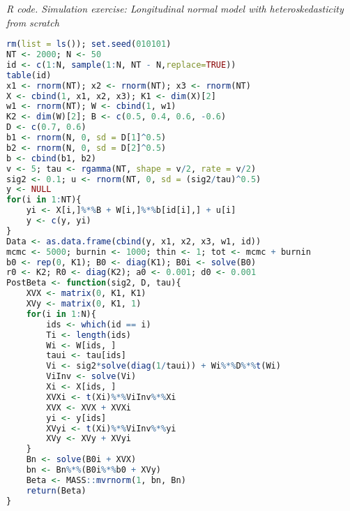 \begin{tcolorbox}[enhanced,width=4.67in,center upper,
	fontupper=\large\bfseries,drop shadow southwest,sharp corners]
	\textit{R code. Simulation exercise: Longitudinal normal model with heteroskedasticity from scratch}
	\begin{VF}
		\begin{lstlisting}[language=R]
rm(list = ls()); set.seed(010101)
NT <- 2000; N <- 50
id <- c(1:N, sample(1:N, NT - N,replace=TRUE))
table(id)
x1 <- rnorm(NT); x2 <- rnorm(NT); x3 <- rnorm(NT) 
X <- cbind(1, x1, x2, x3); K1 <- dim(X)[2]
w1 <- rnorm(NT); W <- cbind(1, w1)
K2 <- dim(W)[2]; B <- c(0.5, 0.4, 0.6, -0.6)
D <- c(0.7, 0.6)
b1 <- rnorm(N, 0, sd = D[1]^0.5)
b2 <- rnorm(N, 0, sd = D[2]^0.5)
b <- cbind(b1, b2)
v <- 5; tau <- rgamma(NT, shape = v/2, rate = v/2)
sig2 <- 0.1; u <- rnorm(NT, 0, sd = (sig2/tau)^0.5)
y <- NULL
for(i in 1:NT){
	yi <- X[i,]%*%B + W[i,]%*%b[id[i],] + u[i] 
	y <- c(y, yi)
}
Data <- as.data.frame(cbind(y, x1, x2, x3, w1, id))
mcmc <- 5000; burnin <- 1000; thin <- 1; tot <- mcmc + burnin
b0 <- rep(0, K1); B0 <- diag(K1); B0i <- solve(B0) 
r0 <- K2; R0 <- diag(K2); a0 <- 0.001; d0 <- 0.001
PostBeta <- function(sig2, D, tau){
	XVX <- matrix(0, K1, K1)
	XVy <- matrix(0, K1, 1)
	for(i in 1:N){
		ids <- which(id == i)
		Ti <- length(ids)
		Wi <- W[ids, ]
		taui <- tau[ids]
		Vi <- sig2*solve(diag(1/taui)) + Wi%*%D%*%t(Wi)
		ViInv <- solve(Vi)
		Xi <- X[ids, ]
		XVXi <- t(Xi)%*%ViInv%*%Xi
		XVX <- XVX + XVXi
		yi <- y[ids]
		XVyi <- t(Xi)%*%ViInv%*%yi
		XVy <- XVy + XVyi
	}
	Bn <- solve(B0i + XVX)
	bn <- Bn%*%(B0i%*%b0 + XVy)
	Beta <- MASS::mvrnorm(1, bn, Bn)
	return(Beta)
}
\end{lstlisting}
	\end{VF}
\end{tcolorbox}


